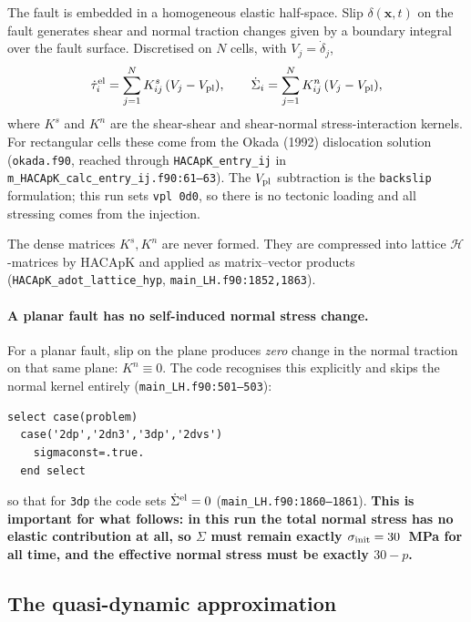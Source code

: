 \documentclass[11pt]{article}
\newcommand{\code}[1]{\texttt{#1}}
\newcommand{\sigtot}{\Sigma}
\begin{document}
The fault is embedded in a homogeneous elastic half-space. Slip
$\delta(\mathbf{x},t)$ on the fault generates shear and normal traction
changes given by a boundary integral over the fault surface. Discretised on
$N$ cells, with $V_j=\dot\delta_j$,
\begin{equation}
  \dot\tau^{\rm el}_i = \sum_{j=1}^{N} K^{s}_{ij}\,(V_j - V_{\rm pl}),
  \qquad
  \dot\sigtot_i = \sum_{j=1}^{N} K^{n}_{ij}\,(V_j - V_{\rm pl}),
  \label{eq:bem}
\end{equation}
where $K^s$ and $K^n$ are the shear-shear and shear-normal stress-interaction
kernels. For rectangular cells these come from the Okada (1992) dislocation
solution (\code{okada.f90}, reached through
\code{HACApK\_entry\_ij} in \code{m\_HACApK\_calc\_entry\_ij.f90:61--63}).
The $V_{\rm pl}$ subtraction is the \code{backslip} formulation; this run sets
\code{vpl 0d0}, so there is no tectonic loading and all stressing comes from
the injection.

The dense matrices $K^s,K^n$ are never formed. They are compressed into
lattice $\mathcal{H}$-matrices by HACApK and applied as matrix--vector
products (\code{HACApK\_\allowbreak adot\_\allowbreak lattice\_\allowbreak hyp},
\code{main\_LH.f90:1852,1863}).

\paragraph{A planar fault has no self-induced normal stress change.}
For a planar fault, slip on the plane produces \emph{zero} change in the
normal traction on that same plane: $K^n\equiv 0$. The code recognises this
explicitly and skips the normal kernel entirely
(\code{main\_LH.f90:501--503}):
\begin{lstlisting}[style=f90]
  select case(problem)
  case('2dp','2dn3','3dp','2dvs')
    sigmaconst=.true.
  end select
\end{lstlisting}
so that for \code{3dp} the code sets $\dot\sigtot^{\rm el}=0$
(\code{main\_LH.f90:1860--1861}). \textbf{This is important for what follows:
in this run the total normal stress has no elastic contribution at all, so
$\sigtot$ must remain exactly $\sigma_{\rm init}=30$~MPa for all time, and the
effective normal stress must be exactly $30-p$.}

\subsection{The quasi-dynamic approximation}
\end{document}
